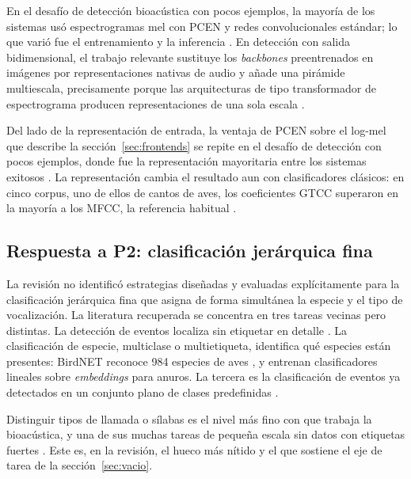 En el desafío de detección bioacústica con pocos ejemplos, la mayoría de los
sistemas usó espectrogramas mel con PCEN y redes convolucionales estándar; lo que
varió fue el entrenamiento y la inferencia \citep{nolasco_learning_2023}. En
detección con salida bidimensional, el trabajo relevante sustituye los
\textit{backbones} preentrenados en imágenes por representaciones nativas de
audio y añade una pirámide multiescala, precisamente porque las arquitecturas de
tipo transformador de espectrograma producen representaciones de una sola escala
\citep{zhu_sound_2025}.

Del lado de la representación de entrada, la ventaja de PCEN sobre el log-mel
que describe la sección~\ref{sec:frontends} \citep{lostanlen_robust_2019} se
repite en el desafío de detección con pocos ejemplos, donde fue la
representación mayoritaria entre los sistemas exitosos
\citep{nolasco_learning_2023}. La representación cambia el resultado aun con
clasificadores clásicos: en cinco corpus, uno de ellos de cantos de aves, los
coeficientes GTCC superaron en la mayoría a los MFCC, la referencia habitual
\citep{bonet-sola_comparative_2021}.

\subsection{Respuesta a P2: clasificación jerárquica fina}

La revisión no identificó estrategias diseñadas y evaluadas explícitamente para
la clasificación jerárquica fina que asigna de forma simultánea la especie y el
tipo de vocalización. La literatura recuperada se concentra en tres tareas
vecinas pero distintas. La detección de eventos localiza sin etiquetar en detalle
\citep{lostanlen_robust_2019,politis_dataset_2020}. La clasificación de especie,
multiclase o multietiqueta, identifica qué especies están presentes: BirdNET
reconoce 984 especies de aves \citep{kahl_birdnet_2021}, y
\citet{kath_leveraging_2024} entrenan clasificadores lineales sobre
\textit{embeddings} para anuros. La tercera es la clasificación de eventos ya
detectados en un conjunto plano de clases predefinidas
\citep{politis_dataset_2020}.

Distinguir tipos de llamada o sílabas es el nivel más fino con que trabaja la
bioacústica, y una de sus muchas tareas de pequeña escala sin datos con etiquetas
fuertes \citep{nolasco_learning_2023}.
Este es, en la revisión, el hueco más nítido y el que sostiene el eje de tarea
de la sección~\ref{sec:vacio}.

